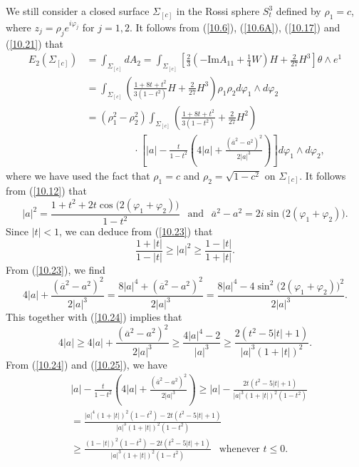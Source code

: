 \documentclass{amsart}
\theoremstyle{Corollary}
\numberwithin{equation}{section}
\begin{document}
We still consider 
a closed surface $\Sigma_{[c]}$ in the Rossi sphere $S^3_t$ defined by 
$\rho_1=c$, 
where $z_j=\rho_j e^{i\varphi_j}$ for $j=1,2$. 
It follows from (\ref{10.6}), (\ref{10.6A}), (\ref{10.17})
and (\ref{10.21})
that 
\begin{equation}\label{10.27}
\begin{split}
E_2(\Sigma_{[c]})&=\int_{\Sigma_{[c]}}dA_2=\int_{\Sigma_{[c]}}\left[\frac{2}{3}\left(-\mbox{Im} A_{11}+\frac{1}{4}W\right)H+\frac{2}{27}H^3\right]\theta\wedge e^1\\
&=\int_{\Sigma_{[c]}}\left(\frac{1+8t+t^2}{3(1-t^2)}H+\frac{2}{27}H^3\right)\rho_1\rho_2d\varphi_1\wedge d\varphi_2\\
&=(\rho_1^2-\rho_2^2)\int_{\Sigma_{[c]}}\left(\frac{1+8t+t^2}{3(1-t^2)}+\frac{2}{27}H^2\right)\\
&\hspace{2cm}\cdot
\left[|a|-\frac{t}{1-t^2}\left(4|a|+\frac{(\overline{a}^2-a^2)^2}{2|a|^3}\right)\right]d\varphi_1\wedge d\varphi_2,
\end{split}
\end{equation}
where we have used the fact that $\rho_1=c$
and $\rho_2=\sqrt{1-c^2}$ on $\Sigma_{[c]}$. 
It follows from (\ref{10.12}) that 
\begin{equation}\label{10.23}
|a|^2=\frac{1+t^2+2t\cos\big(2(\varphi_1+\varphi_2)\big)}{1-t^2}~~\mbox{ and }
~~\overline{a}^2-a^2=2i\sin\big(2(\varphi_1+\varphi_2)\big).
\end{equation}
Since $|t|<1$, we can deduce from (\ref{10.23}) that 
\begin{equation}\label{10.24}
\frac{1+|t|}{1-|t|}\geq|a|^2\geq\frac{1-|t|}{1+|t|}. 
\end{equation}
From (\ref{10.23}), we find 
\begin{equation*}
4|a|+\frac{(\overline{a}^2-a^2)^2}{2|a|^3}
=\frac{8|a|^4+(\overline{a}^2-a^2)^2}{2|a|^3}=\frac{8|a|^4-4\sin^2\big(2(\varphi_1+\varphi_2))^2}{2|a|^3}.
\end{equation*}
This together with (\ref{10.24}) implies that
\begin{equation}\label{10.25}
 4|a|\geq 4|a|+\frac{(\overline{a}^2-a^2)^2}{2|a|^3}
  \geq\frac{4|a|^4-2}{|a|^3}\geq \frac{2(t^2-5|t|+1)}{|a|^3(1+|t|)^2}.
\end{equation}
From (\ref{10.24}) and (\ref{10.25}), we have
\begin{equation*}
\begin{split}
&|a|-\frac{t}{1-t^2}\left(4|a|+\frac{(\overline{a}^2-a^2)^2}{2|a|^3}\right)
\geq |a|- \frac{2t(t^2-5|t|+1)}{|a|^3(1+|t|)^2(1-t^2)}\\
&=\frac{|a|^4(1+|t|)^2(1-t^2)-2t(t^2-5|t|+1)}{|a|^3(1+|t|)^2(1-t^2)}\\
&\geq\frac{(1-|t|)^2(1-t^2)-2t(t^2-5|t|+1)}{|a|^3(1+|t|)^2(1-t^2)}~~\mbox{ whenever }t\leq 0.
\end{split}
\end{equation*}
\end{document}

